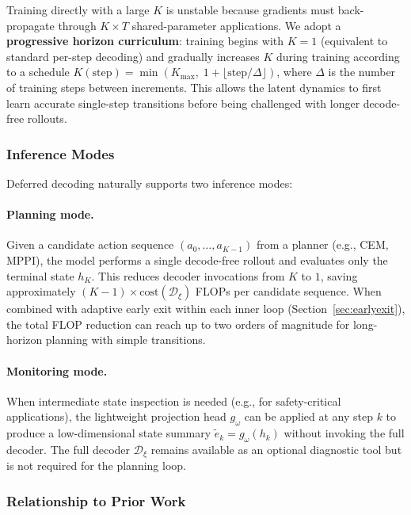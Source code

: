 Training directly with a large $K$ is unstable because gradients must back-propagate through $K \times T$ shared-parameter applications. We adopt a \textbf{progressive horizon curriculum}: training begins with $K = 1$ (equivalent to standard per-step decoding) and gradually increases $K$ during training according to a schedule $K(\text{step}) = \min(K_{\max},\; 1 + \lfloor \text{step} / \Delta \rfloor)$, where $\Delta$ is the number of training steps between increments. This allows the latent dynamics to first learn accurate single-step transitions before being challenged with longer decode-free rollouts.

\subsubsection{Inference Modes}
\label{sec:dd_inference}

Deferred decoding naturally supports two inference modes:

\paragraph{Planning mode.}
Given a candidate action sequence $(a_0, \ldots, a_{K-1})$ from a planner (e.g., CEM, MPPI), the model performs a single decode-free rollout and evaluates only the terminal state $h_K$.  This reduces decoder invocations from $K$ to $1$, saving approximately $(K-1) \times \text{cost}(\mathcal{D}_\xi)$ FLOPs per candidate sequence. When combined with adaptive early exit within each inner loop (Section~\ref{sec:earlyexit}), the total FLOP reduction can reach up to two orders of magnitude for long-horizon planning with simple transitions.

\paragraph{Monitoring mode.}
When intermediate state inspection is needed (e.g., for safety-critical applications), the lightweight projection head $g_\omega$ can be applied at any step $k$ to produce a low-dimensional state summary $\tilde{e}_k = g_\omega(h_k)$ without invoking the full decoder. The full decoder $\mathcal{D}_\xi$ remains available as an optional diagnostic tool but is not required for the planning loop.

\subsubsection{Relationship to Prior Work}
\label{sec:dd_prior}

